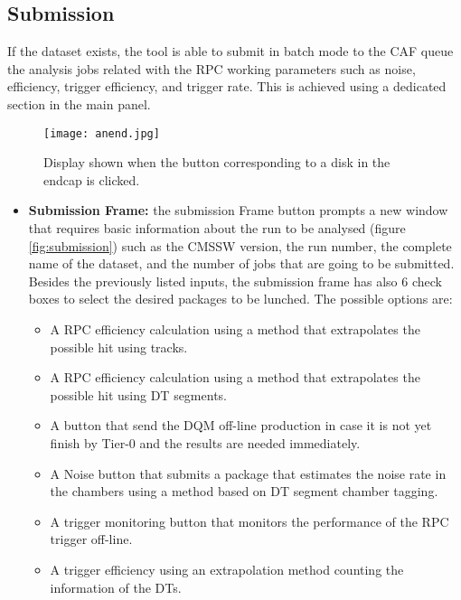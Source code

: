 \documentclass[11pt]{amsart}
\begin{document}
\subsection{Submission} 
If the dataset exists, the tool is able to submit in batch mode to the CAF queue the analysis jobs related with the RPC working parameters such as noise, efficiency, trigger efficiency, and trigger rate. This is achieved using a dedicated section in the main panel.\\
\begin{figure}[htb] %
   \centering
   \texttt{[image: anend.jpg]} 
   \caption{Display shown when the button corresponding to a disk in the endcap is clicked.}
   \label{fig:grapdisk}
\end{figure}
\begin{itemize}
\item\textbf{Submission Frame:}
the submission Frame button prompts a new window that requires basic information about the run to be analysed (figure \ref{fig:submission}) such as the CMSSW version, the run number, the complete name of the dataset, and the number of jobs that are going to be submitted.
Besides the previously listed inputs, the submission frame has also 6 check boxes to select the desired packages to be lunched. The possible options are:\\
\begin{itemize}
\item A RPC efficiency calculation using a method that extrapolates the possible hit using tracks.\\ 
\item A RPC efficiency calculation using a method that extrapolates the possible hit using DT segments.\\
\item A button that  send the DQM off-line production in case it is not yet finish by Tier-0 and the results are needed immediately.\\
\item A Noise button that submits a package that estimates the noise rate in the chambers using a method based on DT segment chamber tagging.\\ 
\item A trigger monitoring button that monitors the performance of the RPC trigger off-line.\\
\item A trigger efficiency using an extrapolation method counting the information of the DTs.\\

\end{itemize}
\end{itemize}
\end{document}

